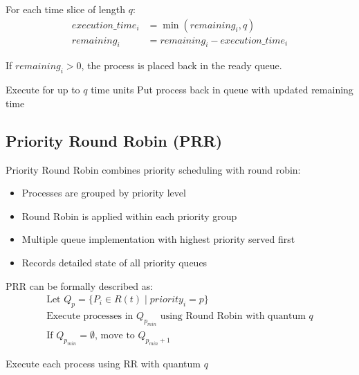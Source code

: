 \documentclass[12pt,a4paper]{report}
\begin{document}
For each time slice of length $q$:
\begin{align}
execution\_time_i &= \min(remaining_i, q)\\
remaining_i &= remaining_i - execution\_time_i
\end{align}

If $remaining_i > 0$, the process is placed back in the ready queue.

\begin{algorithm}[H]
\caption{Round Robin Algorithm}
\begin{algorithmic}[1]
            \State Execute for up to $q$ time units
                \State Put process back in queue with updated remaining time
            \EndIf
        \EndFor
    \EndWhile
\end{algorithmic}
\end{algorithm}

\subsection{Priority Round Robin (PRR)}
Priority Round Robin combines priority scheduling with round robin:
\begin{itemize}
    \item Processes are grouped by priority level
    \item Round Robin is applied within each priority group
    \item Multiple queue implementation with highest priority served first
    \item Records detailed state of all priority queues
\end{itemize}

PRR can be formally described as:
\begin{align}
\text{Let } Q_p = \{P_i \in R(t) \mid priority_i = p\}\\
\text{Execute processes in } Q_{p_{min}} \text{ using Round Robin with quantum } q\\
\text{If } Q_{p_{min}} = \emptyset \text{, move to } Q_{p_{min}+1}
\end{align}

\begin{algorithm}[H]
\caption{Priority Round Robin Algorithm}
\begin{algorithmic}[1]
                \State Execute each process using RR with quantum $q$
            \EndWhile
        \EndFor
    \EndWhile
\end{algorithmic}
\end{algorithm}
\end{document}
